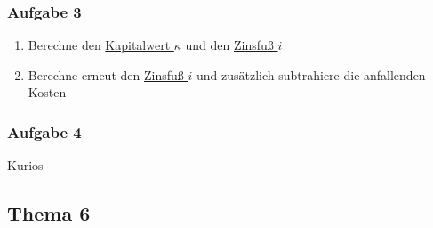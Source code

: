 	\subsubsection*{Aufgabe 3}
	\begin{enumerate}[label=\alph*)]
		\item Berechne den \hyperref[Kapitalwert]{Kapitalwert $\kappa$} und den \hyperref[Zinsfuss]{Zinsfuß $i$}
		\item Berechne erneut den \hyperref[Zinsfuss]{Zinsfuß $i$} und zusätzlich subtrahiere die anfallenden Kosten 
	\end{enumerate}

	\subsubsection*{Aufgabe 4}
	Kurios
	
	\subsection*{Thema 6}
